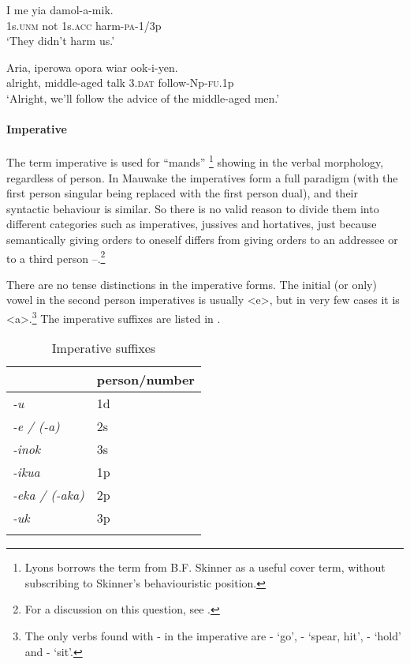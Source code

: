 \ea%
\label{ex:3:x693}
\gll I me yia damol-a-mik. \\
1s.\textsc{unm} not 1s.\textsc{acc} harm-\textsc{pa}-1/3p\\
\glt`They didn't harm us.'
\z

\ea%
\label{ex:3:x694}
\gll Aria, iperowa opora wiar ook-i-yen. \\
alright, middle-aged talk 3.\textsc{dat} follow-Np-\textsc{fu}.1p\\
\glt`Alright, we'll follow the advice of the middle-aged men.'
\z

\paragraph{Imperative}\label{sec:3.8.3.3.2}
{}
The term imperative is used for ``mands'' \citep[745]{Lyons1977}\footnote{Lyons borrows the term from B.F. Skinner as a useful cover term, without subscribing to Skinner's behaviouristic position.} showing in the verbal morphology, regardless of person. In Mauwake the imperatives form a full paradigm (with the first person singular being replaced with the first person dual), and their syntactic behaviour is similar. So there is no valid reason to divide them into different categories such as imperatives, jussives and hortatives, just because semantically giving orders to oneself differs from giving orders to an addressee or to a third person --.\footnote{For a discussion on this question, see \citet[109--111]{Palmer1986}.}

There are no tense distinctions in the imperative forms. The initial (or only) vowel in the second person imperatives is usually <e>, but in very few cases it is <a>.\footnote{The only verbs found with - in the imperative are - `go', - `spear, hit', - `hold' and - `sit'.} The imperative suffixes are listed in . 

\begin{table}
\caption{Imperative suffixes}
\label{tab:3:imperative}

\begin{tabular}{>{\itshape}ll}
\mytoprule
&person/number \\
\midrule 
-u & 1d\\
-e / (-a) & 2s\\
-inok & 3s\\
-ikua & 1p\\
-eka / (-aka) & 2p\\
-uk & 3p\\
\mybottomrule 
\end{tabular}

\end{table}

